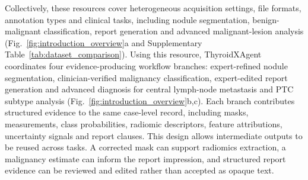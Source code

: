 \documentclass[fleqn,10pt]{wlscirep}
\begin{document}

Collectively, these resources cover heterogeneous acquisition settings, file formats, annotation types and clinical tasks, including nodule segmentation, benign-malignant classification, report generation and advanced malignant-lesion analysis (Fig.~\ref{fig:introduction_overview}a and Supplementary Table~\ref{tab:dataset_comparison}). Using this resource, ThyroidXAgent coordinates four evidence-producing workflow branches: expert-refined nodule segmentation, clinician-verified malignancy classification, expert-edited report generation and advanced diagnosis for central lymph-node metastasis and PTC subtype analysis (Fig.~\ref{fig:introduction_overview}b,c). Each branch contributes structured evidence to the same case-level record, including masks, measurements, class probabilities, radiomic descriptors, feature attributions, uncertainty signals and report clauses. This design allows intermediate outputs to be reused across tasks. A corrected mask can support radiomics extraction, a malignancy estimate can inform the report impression, and structured report evidence can be reviewed and edited rather than accepted as opaque text.
\end{document}
